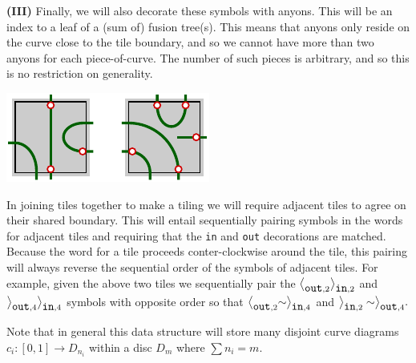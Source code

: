 \documentclass[aps, prl, letterpaper, twocolumn, superscriptaddress, notitlepage, 10pt]{revtex4-1}
\begin{document}
{\bf (III)} Finally, we will also decorate these symbols with anyons.
This will be an index to a leaf of a (sum of) fusion tree(s).
This means that anyons only reside on the curve close
to the tile boundary,
and so we cannot have more than two anyons
for each piece-of-curve. 
The number of such pieces is arbitrary, and so this
is no restriction on generality.

\begin{center}
\includegraphics[]{pic-cells-2.pdf}
\end{center}

In joining tiles together to make a tiling we will
require adjacent tiles to agree on their shared boundary.
This will entail sequentially pairing symbols in the
words for adjacent tiles
and requiring that 
the {\tt in} and {\tt out} decorations are matched.
Because the word for a tile proceeds conter-clockwise
around the tile, this pairing will always reverse the
sequential order of the symbols of adjacent tiles.
For example, given the above two tiles we sequentially pair the 
$\bigl<_{\mbox{\tt out},2}\bigr>_{\mbox{\tt in},2}$ 
and $\bigr>_{\mbox{\tt out},4}\bigr>_{\mbox{\tt in},4}$
symbols with opposite order so that
$\bigl<_{\mbox{\tt out},2}\sim\bigr>_{\mbox{\tt in},4}$
and $\bigr>_{\mbox{\tt in},2} \sim \bigr>_{\mbox{\tt out},4}.$ 


Note that in general this data structure will store many disjoint curve diagrams
$c_i:[0,1]\to D_{n_i}$ within a disc $D_m$ where $\sum n_i = m.$

\end{document}

